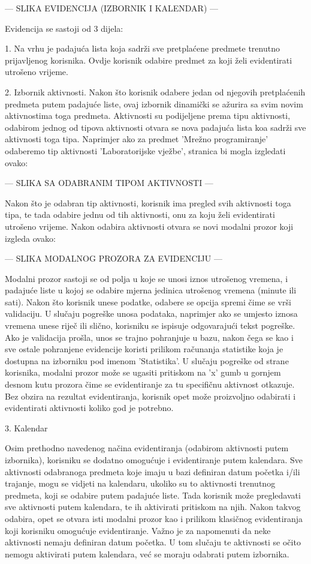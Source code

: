 \documentclass[times, utf8, zavrsni]{fer}
\begin{document}
--- SLIKA EVIDENCIJA (IZBORNIK I KALENDAR) ---

Evidencija se sastoji od 3 dijela:

1. Na vrhu je padajuća lista koja sadrži sve pretplaćene predmete trenutno prijavljenog korisnika. Ovdje korisnik odabire predmet za koji želi evidentirati utrošeno vrijeme.

2. Izbornik aktivnosti. Nakon što korisnik odabere jedan od njegovih pretplaćenih predmeta putem padajuće liste, ovaj izbornik dinamički se ažurira sa svim novim aktivnostima toga predmeta. Aktivnosti su podijeljene prema tipu aktivnosti, odabirom jednog od tipova aktivnosti otvara se nova padajuća lista koa sadrži sve aktivnosti toga tipa. Naprimjer ako za predmet 'Mrežno programiranje' odaberemo tip aktivnosti 'Laboratorijske vježbe', stranica bi mogla izgledati ovako:

--- SLIKA SA ODABRANIM TIPOM AKTIVNOSTI ---

Nakon što je odabran tip aktivnosti, korisnik ima pregled svih aktivnosti toga tipa, te tada odabire jednu od tih aktivnosti, onu za koju želi evidentirati utrošeno vrijeme. Nakon odabira aktivnosti otvara se novi modalni prozor koji izgleda ovako:

--- SLIKA MODALNOG PROZORA ZA EVIDENCIJU ---

Modalni prozor sastoji se od polja u koje se unosi iznos utrošenog vremena, i padajuće liste u kojoj se odabire mjerna jedinica utrošenog vremena (minute ili sati). Nakon što korisnik unese podatke, odabere se opcija spremi čime se vrši validaciju. U slučaju pogreške unosa podataka, naprimjer ako se umjesto iznosa vremena unese riječ ili slično, korisniku se ispisuje odgovarajući tekst pogreške. Ako je validacija prošla, unos se trajno pohranjuje u bazu, nakon čega se kao i sve ostale pohranjene evidencije koristi prilikom računanja statistike koja je dostupna na izborniku pod imenom 'Statistika'.
U slučaju pogreške od strane korisnika, modalni prozor može se ugasiti pritiskom na 'x' gumb u gornjem desnom kutu prozora čime se evidentiranje za tu specifičnu aktivnost otkazuje.
Bez obzira na rezultat evidentiranja, korisnik opet može proizvoljno odabirati i evidentirati aktivnosti koliko god je potrebno.

3. Kalendar

Osim prethodno navedenog načina evidentiranja (odabirom aktivnosti putem izbornika), korisniku se dodatno omogućuje i evidentiranje putem kalendara. Sve aktivnosti odabranoga predmeta koje imaju u bazi definiran datum početka i/ili trajanje, mogu se vidjeti na kalendaru, ukoliko su to aktivnosti trenutnog predmeta, koji se odabire putem padajuće liste. Tada korisnik može pregledavati sve aktivnosti putem kalendara, te ih aktivirati pritiskom na njih. Nakon takvog odabira, opet se otvara isti modalni prozor kao i prilikom klasičnog evidentiranja koji korisniku omogućuje evidentiranje. Važno je za napomenuti da neke aktivnosti nemaju definiran datum početka. U tom slučaju te aktivnosti se očito nemogu aktivirati putem kalendara, već se moraju odabrati putem izbornika.
\end{document}
